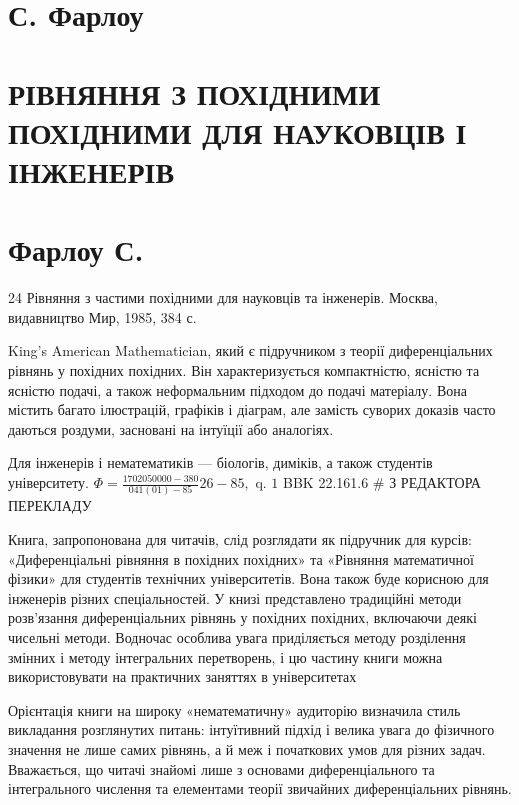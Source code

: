 \documentclass[
  ukrainian,
]{article}
\author{}
\date{}
\begin{document}
\section{С. Фарлоу}\label{ux441.-ux444ux430ux440ux43bux43eux443}

\section{РІВНЯННЯ З ПОХІДНИМИ ПОХІДНИМИ ДЛЯ НАУКОВЦІВ І
ІНЖЕНЕРІВ}\label{ux440ux456ux432ux43dux44fux43dux43dux44f-ux437-ux43fux43eux445ux456ux434ux43dux438ux43cux438-ux43fux43eux445ux456ux434ux43dux438ux43cux438-ux434ux43bux44f-ux43dux430ux443ux43aux43eux432ux446ux456ux432-ux456-ux456ux43dux436ux435ux43dux435ux440ux456ux432}

\section{Фарлоу С.}\label{ux444ux430ux440ux43bux43eux443-ux441.}

24 Рівняння з частими похідними для науковців та інженерів. Москва,
видавництво Мир, 1985, 384 с.

King's American Mathematician, який є підручником з теорії
диференціальних рівнянь у похідних похідних. Він характеризується
компактністю, ясністю та ясністю подачі, а також неформальним підходом
до подачі матеріалу. Вона містить багато ілюстрацій, графіків і діаграм,
але замість суворих доказів часто даються роздуми, засновані на інтуїції
або аналогіях.

Для інженерів і нематематиків --- біологів, диміків, а також студентів
університету.
\(\Phi = \frac{1702050000-380}{041(01)-85} 26-85, \text{ q. 1}\) BBK
22.161.6 \# З РЕДАКТОРА ПЕРЕКЛАДУ

Книга, запропонована для читачів, слід розглядати як підручник для
курсів: «Диференціальні рівняння в похідних похідних» та «Рівняння
математичної фізики» для студентів технічних університетів. Вона також
буде корисною для інженерів різних спеціальностей. У книзі представлено
традиційні методи розв'язання диференціальних рівнянь у похідних
похідних, включаючи деякі чисельні методи. Водночас особлива увага
приділяється методу розділення змінних і методу інтегральних
перетворень, і цю частину книги можна використовувати на практичних
заняттях в університетах

Орієнтація книги на широку «нематематичну» аудиторію визначила стиль
викладання розглянутих питань: інтуїтивний підхід і велика увага до
фізичного значення не лише самих рівнянь, а й меж і початкових умов для
різних задач. Вважається, що читачі знайомі лише з основами
диференціального та інтегрального числення та елементами теорії
звичайних диференціальних рівнянь.
\end{document}
